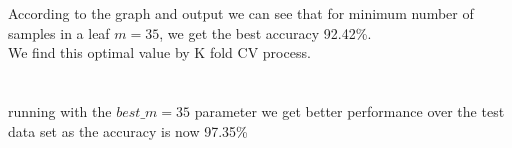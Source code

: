 \documentclass[12pt]{article}
\begin{document}
\\
\\
According to the graph and output we can see that for minimum number of samples in a leaf $m=35$, we get the best accuracy 92.42\%.\\
We find this optimal value by K fold CV process.\\
\\
\\
running with the  $best\_m=35$ parameter we get better performance over the test data set as the accuracy is now 97.35\%
\end{document}
